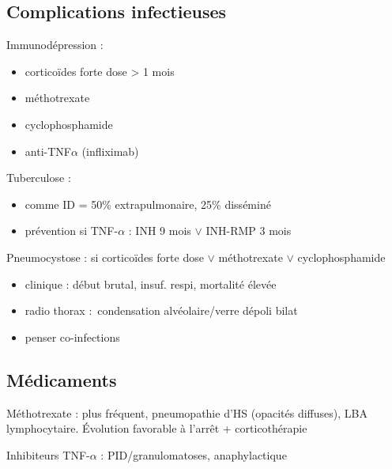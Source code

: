\subsection{Complications infectieuses}
Immunodépression :
\begin{itemize}
  \item corticoïdes forte dose > 1 mois
  \item méthotrexate
  \item cyclophosphamide
  \item anti-TNF$\alpha$ (infliximab)
\end{itemize}
Tuberculose : 
\begin{itemize}
  \item comme ID = 50\% extrapulmonaire, 25\% disséminé
  \item prévention si TNF-$\alpha$ : INH 9 mois $\vee$ INH-RMP 3 mois
\end{itemize}
Pneumocystose : si corticoïdes forte dose $\vee$ méthotrexate $\vee$
cyclophosphamide
\begin{itemize}
  \item clinique : début brutal, insuf. respi, mortalité élevée
  \item radio thorax : condensation alvéolaire/verre dépoli bilat
  \item penser co-infections
\end{itemize}
\subsection{Médicaments}
Méthotrexate : plus fréquent, pneumopathie d'HS (opacités diffuses), LBA
lymphocytaire. Évolution favorable à l'arrêt + corticothérapie

Inhibiteurs TNF-$\alpha$ : PID/granulomatoses, anaphylactique

